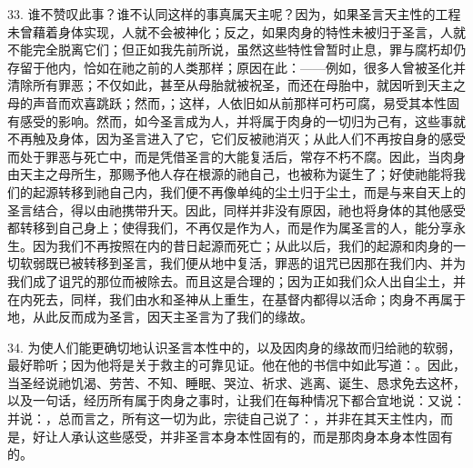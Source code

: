 33. 谁不赞叹此事？谁不认同这样的事真属天主呢？因为，如果圣言天主性的工程未曾藉着身体实现，人就不会被神化；反之，如果肉身的特性未被归于圣言，人就不能完全脱离它们；但正如我先前所说，虽然这些特性曾暂时止息，罪与腐朽却仍存留于他内，恰如在祂之前的人类那样；原因在此：——例如，很多人曾被圣化并清除所有罪恶；不仅如此，甚至从母胎就被祝圣，而还在母胎中，就因听到天主之母的声音而欢喜跳跃；然而，；这样，人依旧如从前那样可朽可腐，易受其本性固有感受的影响。然而，如今圣言成为人，并将属于肉身的一切归为己有，这些事就不再触及身体，因为圣言进入了它，它们反被祂消灭；从此人们不再按自身的感受而处于罪恶与死亡中，而是凭借圣言的大能复活后，常存不朽不腐。因此，当肉身由天主之母所生，那赐予他人存在根源的祂自己，也被称为诞生了；好使祂能将我们的起源转移到祂自己内，我们便不再像单纯的尘土归于尘土，而是与来自天上的圣言结合，得以由祂携带升天。因此，同样并非没有原因，祂也将身体的其他感受都转移到自己身上；使得我们，不再仅是作为人，而是作为属圣言的人，能分享永生。因为我们不再按照在内的昔日起源而死亡；从此以后，我们的起源和肉身的一切软弱既已被转移到圣言，我们便从地中复活，罪恶的诅咒已因那在我们内、并为我们成了诅咒的那位而被除去。而且这是合理的；因为正如我们众人出自尘土，并在内死去，同样，我们由水和圣神从上重生，在基督内都得以活命；肉身不再属于地，从此反而成为圣言，因天主圣言为了我们的缘故。\par

34. 为使人们能更确切地认识圣言本性中的，以及因肉身的缘故而归给祂的软弱，最好聆听；因为他将是关于救主的可靠见证。他在他的书信中如此写道：。因此，当圣经说祂饥渴、劳苦、不知、睡眠、哭泣、祈求、逃离、诞生、恳求免去这杯，以及一句话，经历所有属于肉身之事时，让我们在每种情况下都合宜地说：又说：并说：，总而言之，所有这一切为此，宗徒自己说了：，并非在其天主性内，而是，好让人承认这些感受，并非圣言本身本性固有的，而是那肉身本身本性固有的。\par

